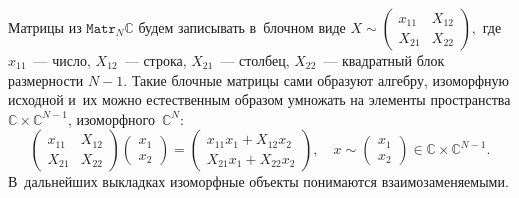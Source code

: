 Матрицы из \( \mathtt{Matr}_N\mathbb{C} \) будем записывать в~блочном виде
\( X \sim
    \begin{pmatrix}
    x_{11} & X_{12} \\
    X_{21} & X_{22}
    \end{pmatrix}, \)
    где \( x_{11} \)~--- число,
    \( X_{12} \)~--- строка, \( X_{21} \)~--- столбец,
    \( X_{22} \)~--- квадратный блок размерности \( N-1 \).
Такие блочные матрицы сами образуют алгебру, изоморфную исходной
и~их можно естественным образом умножать
на элементы пространства \( \mathbb{C}\times\mathbb{C}^{N-1} \),
изоморфного~\( \mathbb{C}^N \):
\[
    \begin{pmatrix}
    x_{11} & X_{12} \\
    X_{21} & X_{22}
    \end{pmatrix}
    \begin{pmatrix} x_1 \\ x_2 \end{pmatrix}
  = \begin{pmatrix}
      x_{11} x_1 + X_{12} x_2 \\
      X_{21} x_1 + X_{22} x_2
      \end{pmatrix},\quad x \sim \begin{pmatrix} x_1 \\ x_2 \end{pmatrix}\in \mathbb{C}\times\mathbb{C}^{N-1}.
    \]
В~дальнейших выкладках изоморфные объекты понимаются взаимозаменяемыми.

